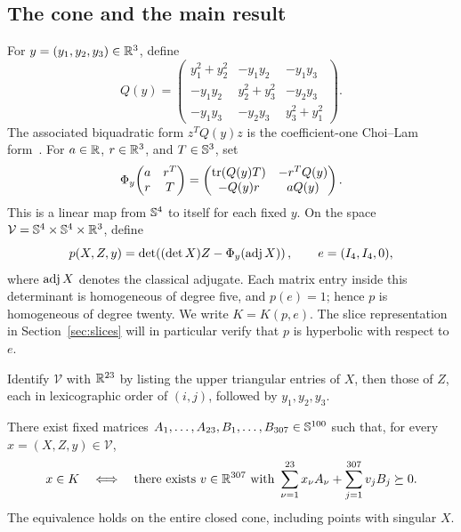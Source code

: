 \subsection{The cone and the main result}
For $y=(y_1,y_2,y_3)\in\mathbb R^3$, define
\begin{equation}\label{eq:Q}
 Q(y)=\begin{pmatrix}
 y_1^2+y_2^2&-y_1y_2&-y_1y_3\\
 -y_1y_2&y_2^2+y_3^2&-y_2y_3\\
 -y_1y_3&-y_2y_3&y_3^2+y_1^2
 \end{pmatrix}.
\end{equation}
The associated biquadratic form $z^TQ(y)z$ is the coefficient-one
Choi--Lam form~\cite[Section~4]{choi-lam1977}.
For $a\in\mathbb R$, $r\in\mathbb R^3$, and $T\in\mathbb S^3$, set
\begin{equation}\label{eq:Phi}
 \Phi_y\!\begin{pmatrix}a&r^T\\r&T\end{pmatrix}
 =\begin{pmatrix}
 \operatorname{tr}(Q(y)T)&-r^TQ(y)\\
 -Q(y)r&aQ(y)
 \end{pmatrix}.
\end{equation}
This is a linear map from $\mathbb S^4$ to itself for each fixed $y$.
On the space $\mathcal V=\mathbb S^4\times\mathbb S^4\times\mathbb R^3$, define
\begin{equation}\label{eq:p}
 p(X,Z,y)=\det\!\left((\det X)Z-\Phi_y(\operatorname{adj} X)\right),
 \qquad e=(I_4,I_4,0),
\end{equation}
where $\operatorname{adj} X$ denotes the classical adjugate. Each matrix entry inside
this determinant is homogeneous of degree five, and $p(e)=1$; hence
$p$ is homogeneous of degree twenty. We write $K=K(p,e)$.
The slice representation in Section~\ref{sec:slices} will in particular
verify that $p$ is hyperbolic with respect to $e$.

Identify $\mathcal V$ with $\mathbb R^{23}$ by listing the upper triangular
entries of $X$, then those of $Z$, each in lexicographic order of
$(i,j)$, followed by $y_1,y_2,y_3$.

\begin{theorem}\label{thm:main}
There exist fixed matrices $A_1,\ldots,A_{23},B_1,\ldots,B_{307}
\in\mathbb S^{100}$ such that, for every $x=(X,Z,y)\in\mathcal V$,
\[
 x\in K\quad\Longleftrightarrow\quad
 \text{there exists }v\in\mathbb R^{307}\text{ with }
 \sum_{\nu=1}^{23}x_\nu A_\nu+
 \sum_{j=1}^{307}v_jB_j\succeq0.
\]
The equivalence holds on the entire closed cone, including points
with singular $X$.
\end{theorem}

